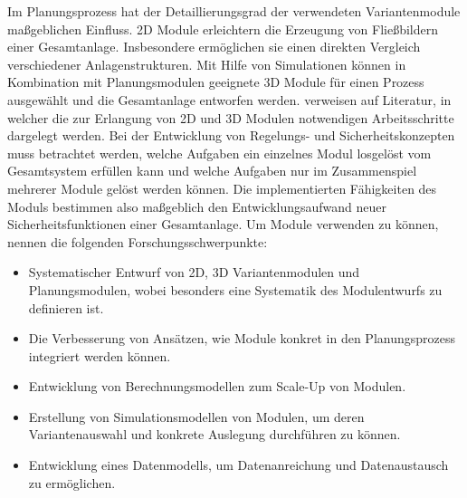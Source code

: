 Im Planungsprozess hat der Detaillierungsgrad der verwendeten Variantenmodule ma\ss{}geblichen Einfluss. 2D Module erleichtern die Erzeugung von Flie\ss{}bildern einer Gesamtanlage. Insbesondere erm\"oglichen sie einen direkten Vergleich verschiedener Anlagenstrukturen. Mit Hilfe von Simulationen k\"onnen in Kombination mit Planungsmodulen geeignete 3D Module f\"ur einen Prozess ausgew\"ahlt und die Gesamtanlage entworfen werden. \citeauthor{Bramsiepe_2012} verweisen auf Literatur, in welcher die zur Erlangung von 2D und 3D Modulen notwendigen Arbeitsschritte dargelegt werden. \newline
Bei der Entwicklung von Regelungs- und Sicherheitskonzepten muss betrachtet werden, welche Aufgaben ein einzelnes Modul losgel\"ost vom Gesamtsystem erf\"ullen kann und welche Aufgaben nur im Zusammenspiel mehrerer Module gel\"ost werden k\"onnen. Die implementierten F\"ahigkeiten des Moduls bestimmen also ma\ss{}geblich den Entwicklungsaufwand neuer Sicherheitsfunktionen einer Gesamtanlage. \newline
Um Module verwenden zu k\"onnen, nennen \citeauthor{Bramsiepe_2012} die folgenden Forschungsschwerpunkte:
\begin{itemize}
\item Systematischer Entwurf von 2D, 3D Variantenmodulen und Planungsmodulen, wobei besonders eine Systematik des Modulentwurfs zu definieren ist.
\item Die Verbesserung von Ans\"atzen, wie Module konkret in den Planungsprozess integriert werden k\"onnen.
\item Entwicklung von Berechnungsmodellen zum Scale-Up von Modulen.
\item Erstellung von Simulationsmodellen von Modulen, um deren Variantenauswahl und konkrete Auslegung durchf\"uhren zu k\"onnen.
\item Entwicklung eines Datenmodells, um Datenanreichung und Datenaustausch zu erm\"oglichen.
\end{itemize}

